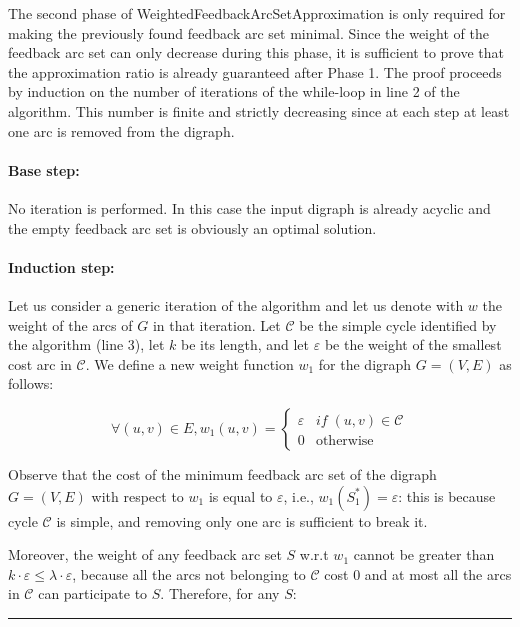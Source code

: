 \documentclass{article}
\newenvironment{proof}{{\bf Proof:}}{\hfill\rule{2mm}{2mm}}
\begin{document}
\begin{proof}
    The second phase of {\sc WeightedFeedbackArcSetApproximation} is only required for making the previously found feedback arc set minimal. Since the weight of the feedback arc set can only decrease during this phase, it is sufficient to prove that the approximation ratio is already guaranteed after Phase 1. The proof proceeds by induction on the number of iterations of the while-loop in line 2 of the algorithm. This number is finite and strictly decreasing since at each step at least one arc is removed from the digraph.
    
    \paragraph{Base step:} No iteration is performed. In this case the input digraph is already acyclic and the empty feedback arc set is obviously an optimal solution.
    
    \paragraph{Induction step:} Let us consider a generic iteration of the algorithm and let us denote with $w$ the weight of the arcs of $G$ in that iteration. Let $\mathcal{C}$ be the simple cycle identified by the algorithm (line 3), let $k$ be its length, and let $\varepsilon$ be the weight of the smallest cost arc in $\mathcal{C}$. We define a new weight function $w_1$ for the digraph $G = (V, E)$ as follows:
    
    \begin{equation*}
    \forall (u,v) \in E, 
    w_1(u,v) = \begin{cases}
               \varepsilon          & if\;(u,v) \in \mathcal{C}\\
               0                    & \text{otherwise}
           \end{cases}
    \end{equation*}
    
    Observe that the cost of the minimum feedback arc set of the digraph $G = (V, E)$ with respect to $w_1$ is equal to $\varepsilon$, i.e., $w_1(S_1^*) = \varepsilon$: this is because cycle $\mathcal{C}$ is simple, and removing only one arc is sufficient to break it.
    
    Moreover, the weight of any feedback arc set $S$ w.r.t $w_1$ cannot be greater than $k\cdot \varepsilon \leq \lambda \cdot \varepsilon$, because all the arcs not belonging to $\mathcal{C}$ cost 0 and at most all the arcs in $\mathcal{C}$ can participate to $S$. Therefore, for any $S$:
    

\end{proof}
\end{document}
